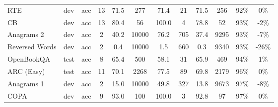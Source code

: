 \documentclass{article}
\begin{document}
\begin{table}
{\begin{adjustwidth}{-1.4in}{-1.4in}
\begin{center}
\begin{tabular}{lccccccccccc}
                 RTE &   dev &      acc &  13 &        71.5 &                       277 &                            71.4 &                        21 &                            71.5 &                       256 &                            92\% &                                                 0\% \\
                  CB &   dev &      acc &  13 &        80.4 &                        56 &                           100.0 &                         4 &                            78.8 &                        52 &                            93\% &                                                -2\% \\
          Anagrams 2 &   dev &      acc &   2 &        40.2 &                     10000 &                            76.2 &                       705 &                            37.4 &                      9295 &                            93\% &                                                -7\% \\
      Reversed Words &   dev &      acc &   2 &         0.4 &                     10000 &                             1.5 &                       660 &                             0.3 &                      9340 &                            93\% &                                               -26\% \\
          OpenBookQA &  test &      acc &   8 &        65.4 &                       500 &                            58.1 &                        31 &                            65.9 &                       469 &                            94\% &                                                 1\% \\
          ARC (Easy) &  test &      acc &  11 &        70.1 &                      2268 &                            77.5 &                        89 &                            69.8 &                      2179 &                            96\% &                                                 0\% \\
          Anagrams 1 &   dev &      acc &   2 &        15.0 &                     10000 &                            49.8 &                       327 &                            13.8 &                      9673 &                            97\% &                                                -8\% \\
                COPA &   dev &      acc &   9 &        93.0 &                       100 &                           100.0 &                         3 &                            92.8 &                        97 &                            97\% &                                                 0\% \\

\end{tabular}
\end{center}
\end{adjustwidth}}
\end{table}
\end{document}
